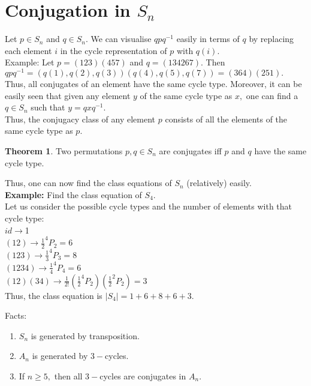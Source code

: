 \documentclass[12 pt, a4paper, toc=graduated, oneside]{article}
\theoremstyle{definition}
\newtheorem{theorem}{Theorem}
\begin{document}
\section{Conjugation in \texorpdfstring{$S_n$}{Sn}}
Let $p \in S_n$ and $q \in S_n.$ We can visualise $qpq^{-1}$ easily in terms of $q$ by replacing each element $i$ in the cycle representation of $p$ with $q(i).$\\
Example: Let $p = (123)(457)$ and $q = (134267).$ Then $qpq^{-1} = (q(1), q(2), q(3))(q(4), q(5), q(7)) = (364)(251).$\\
Thus, all conjugates of an element have the same cycle type. Moreover, it can be easily seen that given any element $y$ of the same cycle type as $x,$ one can find a $q \in S_n$ such that $y = qxq^{-1}.$\\
Thus, the conjugacy class of any element $p$ consists of all the elements of the same cycle type as $p.$\\
\begin{theorem}
	Two permutations $p, q \in S_n$ are conjugates iff $p$ and $q$ have the same cycle type.
\end{theorem}
Thus, one can now find the class equations of $S_n$ (relatively) easily.\\
\textbf{Example:} Find the class equation of $S_4.$\\
Let us consider the possible cycle types and the number of elements with that cycle type:\\
$id \longrightarrow $1\\
$(12) \longrightarrow \frac{1}{2}^4P_2 = 6$\\
$(123) \longrightarrow \frac{1}{3}^4P_3 = 8$\\
$(1234) \longrightarrow \frac{1}{4}^4P_4 = 6$\\
$(12)(34) \longrightarrow \frac{1}{2!}\left(\frac{1}{2}^4P_2\right)\left(\frac{1}{2}^2P_2\right) = 3$\\
Thus, the class equation is $|S_4| = 1 + 6 + 8 + 6 + 3.$

Facts:
\begin{enumerate}[nosep] 
	\item $S_n$ is generated by transposition.
	\item $A_n$ is generated by $3-$cycles.
	\item If $ n \ge 5,$ then all $3-$cycles are conjugates in $A_n.$
\end{enumerate}
\end{document}
